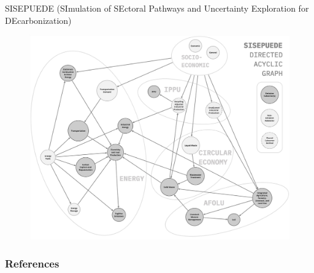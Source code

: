 \documentclass[11pt]{beamer}
\begin{document}
\begin{frame}{SISEPUEDE (SImulation of SEctoral Pathways and Uncertainty Exploration for DEcarbonization)}

\begin{figure}
	\includegraphics[scale=0.12]{images/sisepuede_dag}
\end{figure}
\end{frame}


\begin{frame}[allowframebreaks]
        \frametitle{References}
		

       
\end{frame}
\end{document}
